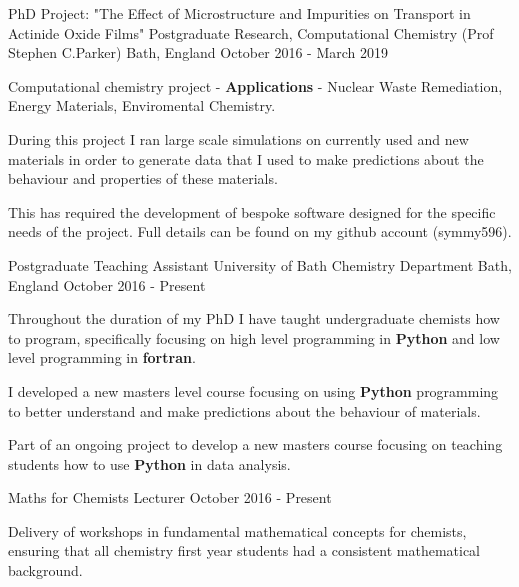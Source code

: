 \begin{cventries}
  \cventry
    {PhD Project: "The Effect of Microstructure and Impurities on Transport in Actinide Oxide Films"}
    {Postgraduate Research, Computational Chemistry (Prof Stephen C.Parker)}
    {Bath, England}
    {October 2016 - March 2019}
    {
      \begin{cvitems}
        \item{Computational chemistry project - \textbf{Applications} - Nuclear Waste Remediation, Energy Materials, Enviromental Chemistry.}
		    \item{During this project I ran large scale simulations on currently used and new materials in order to generate data that I used to make predictions about the behaviour and properties of these materials.}
		    \item{This has required the development of bespoke software designed for the specific needs of the project. Full details can be found on my github account (symmy596).}
      \end{cvitems}
    }

  \cventry
    {Postgraduate Teaching Assistant}
    {University of Bath Chemistry Department}    
    {Bath, England}
    {October 2016 - Present}
    {
      \begin{cvitems}
        \item{Throughout the duration of my PhD I have taught undergraduate chemists how to program, specifically focusing on high level programming in \textbf{Python} and low level programming in \textbf{fortran}.}
        \item{I developed a new masters level course focusing on using \textbf{Python} programming to better understand and make predictions about the behaviour of materials.}
        \item{Part of an ongoing project to develop a new masters course focusing on teaching students how to use \textbf{Python} in data analysis.}
      \end{cvitems}
    }

  \cventry   
    {Maths for Chemists Lecturer}
    {}
    {}
    {October 2016 - Present}
    {
      \begin{cvitems}
        \item
        {Delivery of workshops in fundamental mathematical concepts for chemists, ensuring that all chemistry first year students had a consistent mathematical background.} 
      \end{cvitems}
    }


\end{cventries}
